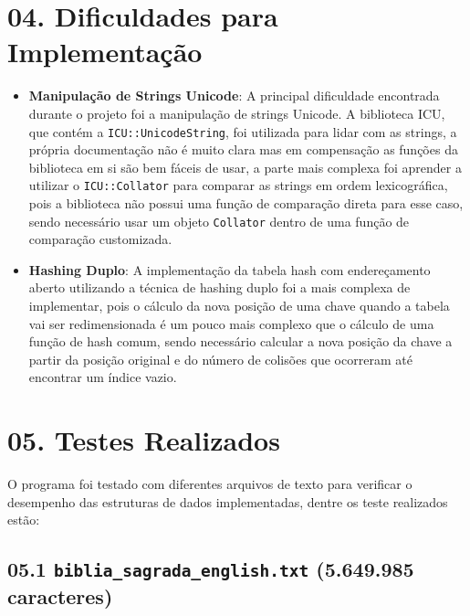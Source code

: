 \documentclass{article}
\begin{document}
\section*{04. Dificuldades para Implementação}
\begin{itemize}
    \item \textbf{Manipulação de Strings Unicode}: A principal dificuldade encontrada durante o projeto foi a manipulação de strings Unicode. A biblioteca ICU, que contém a \texttt{ICU::UnicodeString}, foi utilizada para lidar com as strings, a própria documentação não é muito clara mas em compensação as funções da biblioteca em si são bem fáceis de usar, a parte mais complexa foi aprender a utilizar o \texttt{ICU::Collator} para comparar as strings em ordem lexicográfica, pois a biblioteca não possui uma função de comparação direta para esse caso, sendo necessário usar um objeto \texttt{Collator} dentro de uma função de comparação customizada.
    \item \textbf{Hashing Duplo}: A implementação da tabela hash com endereçamento aberto utilizando a técnica de hashing duplo foi a mais complexa de implementar, pois o cálculo da nova posição de uma chave quando a tabela vai ser redimensionada é um pouco mais complexo que o cálculo de uma função de hash comum, sendo necessário calcular a nova posição da chave a partir da posição original e do número de colisões que ocorreram até encontrar um índice vazio.
\end{itemize}

\section*{05. Testes Realizados}

O programa foi testado com diferentes arquivos de texto para verificar o desempenho das estruturas de dados implementadas, dentre os teste realizados estão:


\subsection*{05.1 \texttt{biblia\_sagrada\_english.txt} (5.649.985 caracteres)}
\end{document}
